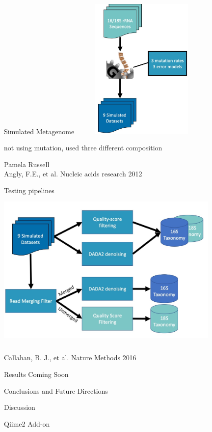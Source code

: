 \documentclass[11pt, xcolor=table]{beamer}
\begin{document}
	\begin{frame}{Simulated Metagenome}
	\center
	\includegraphics[height=7cm, width=7cm]{CPBS_11_18/simulated.jpg}
	\begin{flushright}
	
	not using mutation, used three different composition
	
	
	\tiny{Pamela Russell \\ Angly, F.E., et al. Nucleic acids research 2012}
	\end{flushright}
	\end{frame}
	\begin{frame}{Testing pipelines}
	\vspace{-0.5cm}
	\center
	\includegraphics[height=8cm, width=11cm]{CPBS_11_18/duo_pipe.jpg}
	\begin{flushright}
	\tiny{Callahan, B. J., et al. Nature Methods 2016}
	\end{flushright}
	
	\end{frame}
	\begin{frame}{Results}
	Coming Soon
	\end{frame}
	\begin{frame}{Conclusions and Future Directions}
	\begin{block}{Discussion}
	
	\end{block}
	
	\begin{block}{Qiime2 Add-on}
	\end{block}

	\end{frame}
	
\end{document}
